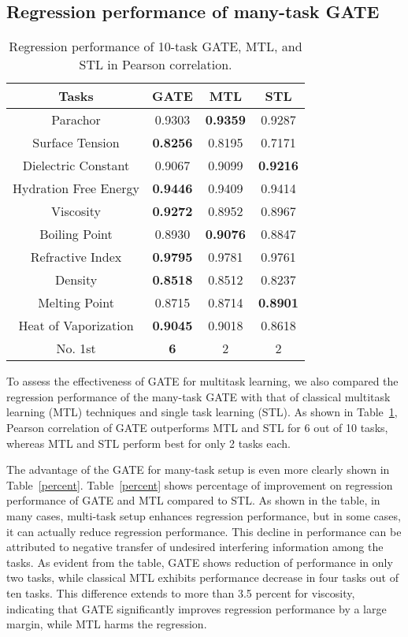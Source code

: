 \subsection{Regression performance of many-task GATE}

\begin{table}[!ht]
\caption{Regression performance of 10-task GATE, MTL, and STL in Pearson correlation.}
\label{corr}
\begin{center}
    \begin{tabular}{|c|c|c|c|}
    \hline
        \textbf{Tasks} & \textbf{GATE} & \textbf{MTL} & \textbf{STL} \\ \hline \hline
        Parachor & 0.9303 & \textbf{0.9359} & 0.9287  \\ \hline
        Surface Tension & \textbf{0.8256} & 0.8195 & 0.7171  \\ \hline
        Dielectric Constant & 0.9067 & 0.9099 & \textbf{0.9216}  \\ \hline
        Hydration Free Energy & \textbf{0.9446} & 0.9409 & 0.9414  \\ \hline
        Viscosity & \textbf{0.9272} & 0.8952 & 0.8967  \\ \hline
        Boiling Point & 0.8930 & \textbf{0.9076} & 0.8847  \\ \hline
        Refractive Index & \textbf{0.9795} & 0.9781 & 0.9761  \\ \hline
        Density & \textbf{0.8518} & 0.8512 & 0.8237  \\ \hline
        Melting Point & 0.8715 & 0.8714 & \textbf{0.8901}  \\ \hline
        Heat of Vaporization & \textbf{0.9045} & 0.9018 & 0.8618  \\ \hline \hline
        No. 1st & \textbf{6} & 2 & 2  \\ \hline
    \end{tabular}
\end{center}
\end{table}

  To assess the effectiveness of GATE for multitask learning, we also compared the regression performance of the many-task GATE with that of classical multitask learning (MTL) techniques and single task learning (STL). As shown in Table~\ref{corr}, Pearson correlation of GATE outperforms MTL and STL for 6 out of 10 tasks, whereas MTL and STL perform best for only 2 tasks each.

  The advantage of the GATE for many-task setup is even more clearly shown in Table~\ref{percent}. Table~\ref{percent} shows percentage of improvement on regression performance of GATE and MTL compared to STL. As shown in the table, in many cases, multi-task setup enhances regression performance, but in some cases, it can actually reduce regression performance. This decline in performance can be attributed to negative transfer of undesired interfering information among the tasks. As evident from the table, GATE shows reduction of performance in only two tasks, while classical MTL exhibits performance decrease in four tasks out of ten tasks. This difference extends to more than 3.5 percent for viscosity, indicating that GATE significantly improves regression performance by a large margin, while MTL harms the regression. 

